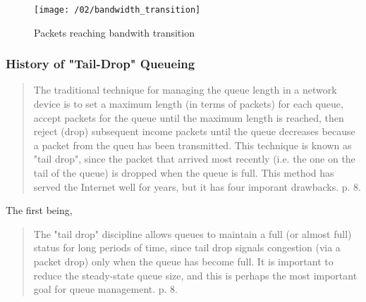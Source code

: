 
\begin{figure}[H]
\texttt{[image: /02/bandwidth\_transition]}
\caption{Packets reaching bandwith transition}
\label{fig:bandwidth_transition}
\end{figure}



\subsubsection{History of "Tail-Drop" Queueing}

\begin{quote}
The traditional technique for managing the queue length in a network device is to set a maximum
    length (in terms of packets) for each queue, accept packets for the queue until the maximum
    length is reached, then reject (drop) subsequent income packets until the queue decreases
    because a packet from the queu has been transmitted. This technique is known as "tail drop",
    since the packet that arrived most recently (i.e. the one on the tail of the queue) is dropped
    when the queue is full. This method has served the Internet well for years, but it has four
    imporant drawbacks. \cite{rfc7567} p. 8.
\end{quote}

The first being,

\begin{quote}
The "tail drop" discipline allows queues to maintain a full (or almost full) status for long periods
of time, since tail drop signals congestion (via a packet drop) only when the queue has become
full. It is important to reduce the steady-state queue size, and this is perhaps the most
important goal for queue management. \cite{rfc7567} p. 8.
\end{quote}



